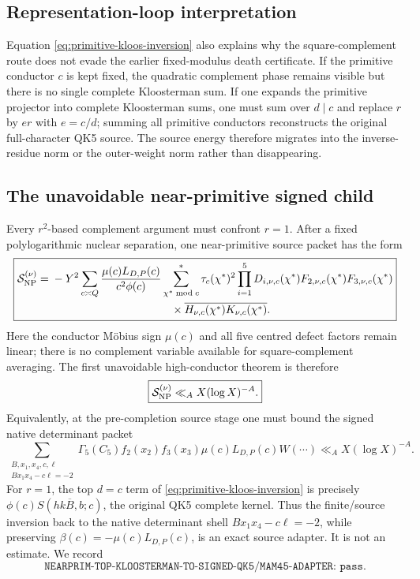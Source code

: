 \documentclass[11pt]{article}
\theoremstyle{definition}
\newcommand{\1}{\mathbf 1}
\begin{document}
\subsection{Representation-loop interpretation}

Equation \eqref{eq:primitive-kloos-inversion} also explains why the
square-complement route does not evade the earlier fixed-modulus death
certificate.  If the primitive conductor $c$ is kept fixed, the quadratic
complement phase remains visible but there is no single complete Kloosterman
sum.  If one expands the primitive projector into complete Kloosterman sums,
one must sum over $d\mid c$ and replace $r$ by $er$ with $e=c/d$; summing all
primitive conductors reconstructs the original full-character QK5 source.
The source energy therefore migrates into the inverse-residue norm or the
outer-weight norm rather than disappearing.

\subsection{The unavoidable near-primitive signed child}

Every $r^2$-based complement argument must confront $r=1$.  After a fixed
polylogarithmic nuclear separation, one near-primitive source packet has the
form
\begin{equation}
\boxed{
\begin{aligned}
 \mathcal S_{\rm NP}^{(\nu)}
 ={}&-Y^2\sum_{c\asymp Q}
 \frac{\mu(c)L_{D,P}(c)}{c^2\phi(c)}
 \sum_{\chi^*\bmod c}^{*}\tau_c(\chi^*)^2
 \prod_{i=1}^5D_{i,\nu,c}(\chi^*)
 F_{2,\nu,c}(\chi^*)F_{3,\nu,c}(\chi^*)\\
 &\hspace{38mm}\times
 \overline{H_{\nu,c}(\chi^*)K_{\nu,c}(\chi^*)}.
\end{aligned}}
\label{eq:nearprim-signed}
\end{equation}
Here the conductor M\"obius sign $\mu(c)$ and all five centred defect factors
remain linear; there is no complement variable available for square-complement
averaging.  The first unavoidable high-conductor theorem is therefore
\begin{equation}
 \boxed{
 \mathcal S_{\rm NP}^{(\nu)}\ll_A X(\log X)^{-A}.
 }
 \label{eq:nearprim-target}
\end{equation}
Equivalently, at the pre-completion source stage one must bound the signed
native determinant packet
\begin{equation}
 \boxed{
 \sum_{\substack{B,x_1,x_4,c,\ell\\Bx_1x_4-c\ell=-2}}
 \Gamma_5(C_5)f_2(x_2)f_3(x_3)
 \mu(c)L_{D,P}(c)W(\cdots)
 \ll_A X(\log X)^{-A}.
 }
 \label{eq:nearprim-precompletion}
\end{equation}
For $r=1$, the top $d=c$ term of
\eqref{eq:primitive-kloos-inversion} is precisely
$\phi(c)S(hk\overline B,b;c)$, the original QK5 complete kernel.  Thus the
finite/source inversion back to the native determinant shell
$Bx_1x_4-c\ell=-2$, while preserving
$\beta(c)=-\mu(c)L_{D,P}(c)$, is an exact source adapter.  It is not an
estimate.  We record
\[
 \boxed{\texttt{NEARPRIM-TOP-KLOOSTERMAN-TO-SIGNED-QK5/MAM45-ADAPTER: pass}.}
\]
\end{document}
